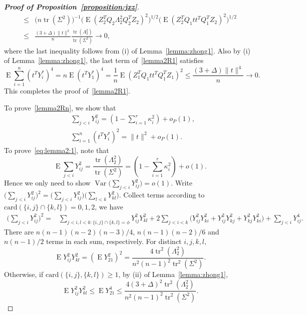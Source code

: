 \documentclass[3p]{elsarticle}
\DeclareMathOperator{\mytr}{tr}
\DeclareMathOperator{\myE}{E}
\DeclareMathOperator{\myVar}{Var}
\theoremstyle{plain}
\theoremstyle{definition}
\theoremstyle{remark}
\begin{document}
\begin{proof}[\textbf{Proof of Proposition~\ref{proposition:jxz}}]
$$\begin{aligned}
    \leq&
    \big( n \mytr(\Sigma^2)\big)^{-1} 
    \big(\myE (Z_2^T Q_2 \Lambda_2^2 Q_2^T Z_2)^2\big)^{1/2} \big(\myE(Z_2^T Q_1 t t^T Q_1^T Z_2)^2\big)^{1/2}\\
    \leq&
     \frac{(3+\Delta) \|t\|^2}{n} 
    \frac{\mytr (\Lambda_2^2)}{\mytr(\Sigma^2)}\to 0,
\end{aligned}
$$
    where the last inequality follows from (i) of Lemma~\ref{lemma:zhong1}. 
    Also by (i) of Lemma~\ref{lemma:zhong1}, the last term of~\eqref{lemma2R1} satisfies 
$$
        \myE\sum_{i=1}^n (t^T Y_i^*)^4=n \myE (t^T Y_1^*)^4
=\frac{1}{n} \myE (Z_1^T Q_1 t t^T Q_1^T Z_1)^2
\leq \frac{(3+\Delta)\|t\|^4}{n}\to 0.
$$
This completes the proof of~\eqref{lemma2R1}.



To prove~\eqref{lemma2Rn}, we show that
\begin{align}
    &\sum_{j<i} Y_{ij}^2= (1-\sum_{i=1}^r \kappa_i^2)+o_P(1),
    \label{eq:lemma2:1}
    \\
    &\sum_{i=1}^n (t^T Y_i^*)^2=\|t\|^2 +o_P(1).
    \label{eq:lemma2:2}
\end{align}
To prove~\eqref{eq:lemma2:1}, note that
$$
    \myE \sum_{j<i} Y_{ij}^2= \frac{\mytr(\Lambda_2^2)}{\mytr(\Sigma^2)}=(1-\sum_{i=1}^r \kappa_i^2)+o(1).
$$
    Hence we only need to show $\myVar\big(\sum_{j<i} Y_{ij}^2)=o(1)$. 
    Write $\big(\sum_{j<i}Y_{ij}^2\big)^2=
        \big(\sum_{j<i}Y_{ij}^2\big)
        \big(\sum_{l<k}Y_{kl}^2\big)$.
    Collect terms according to $\mathrm{card}(\{i,j\}\cap\{k,l\})=0,1,2$, we have
    \begin{equation*}%
    \begin{aligned}
        \big(\sum_{j<i}Y_{ij}^2\big)^2
        =&
        \sum_{j<i,l<k:\{i,j\}\cap \{k,l\}=\phi}Y_{ij}^2 Y_{kl}^2
        +2\sum_{j<i<k}\Big(
        Y_{ij}^2 Y_{ki}^2+
        Y_{ij}^2 Y_{kj}^2
        +
        Y_{kj}^2 Y_{ki}^2
        \Big)
         +
        \sum_{j<i}Y_{ij}^4.
    \end{aligned}
    \end{equation*}
    There are  $n(n-1)(n-2)(n-3)/4$, $n(n-1)(n-2)/6$ and $n(n-1)/2$ terms in each sum, respectively.
    For distinct $i,j,k,l$, 
    $$\myE Y_{ij}^2 Y_{kl}^2=(\myE Y_{21}^2)^2=\frac{4\mytr^2(\Lambda_2^2)}{n^2(n-1)^2\mytr^2(\Sigma^2)}.$$
    Otherwise, if $\text{card}(\{i,j\},\{k,l\})\geq 1$, by (ii) of Lemma~\ref{lemma:zhong1},
    $$\myE Y_{ij}^2 Y_{kl}^2\leq \myE Y_{21}^4\leq \frac{4(3+\Delta)^2\mytr^2(\Lambda_2^2)}{n^2(n-1)^2\mytr^2(\Sigma^2)}.$$

\end{proof}
\end{document}
